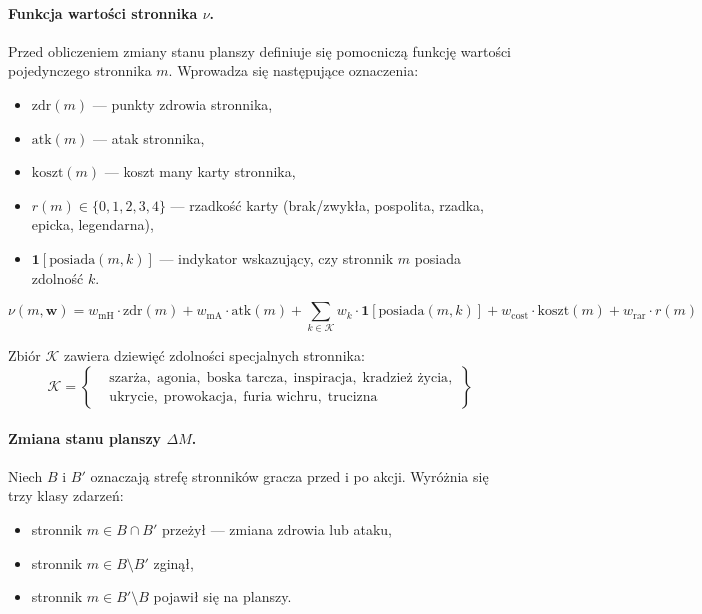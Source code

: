 \paragraph{Funkcja wartości stronnika $\nu$.}

Przed obliczeniem zmiany stanu planszy definiuje się pomocniczą funkcję wartości pojedynczego stronnika $m$. Wprowadza się następujące oznaczenia:
\begin{itemize}
    \item $\text{zdr}(m)$ --- punkty zdrowia stronnika,
    \item $\text{atk}(m)$ --- atak stronnika,
    \item $\text{koszt}(m)$ --- koszt many karty stronnika,
    \item $r(m) \in \{0, 1, 2, 3, 4\}$ --- rzadkość karty (brak/zwykła, pospolita, rzadka, epicka, legendarna),
    \item $\mathbf{1}[\text{posiada}(m, k)]$ --- indykator wskazujący, czy stronnik $m$ posiada zdolność $k$.
\end{itemize}

\begin{equation}
    \nu(m, \mathbf{w}) =
        w_{\text{mH}} \cdot \text{zdr}(m)
        + w_{\text{mA}} \cdot \text{atk}(m)
        + \sum_{k \in \mathcal{K}} w_k \cdot \mathbf{1}[\text{posiada}(m, k)]
        + w_{\text{cost}} \cdot \text{koszt}(m)
        + w_{\text{rar}} \cdot r(m)
    \label{eq:minion_value}
\end{equation}

Zbiór $\mathcal{K}$ zawiera dziewięć zdolności specjalnych stronnika:
\[
\mathcal{K} =
\left\{
\begin{aligned}
&\text{szarża},\; \text{agonia},\; \text{boska tarcza},\; \text{inspiracja},\; \text{kradzież życia},\\
&\text{ukrycie},\; \text{prowokacja},\; \text{furia wichru},\; \text{trucizna}
\end{aligned}
\right\}
\]

\paragraph{Zmiana stanu planszy $\Delta M$.}

Niech $B$ i $B'$ oznaczają strefę stronników gracza przed i po akcji. Wyróżnia się trzy klasy zdarzeń:
\begin{itemize}
    \item stronnik $m \in B \cap B'$ przeżył --- zmiana zdrowia lub ataku,
    \item stronnik $m \in B \setminus B'$ zginął,
    \item stronnik $m \in B' \setminus B$ pojawił się na planszy.
\end{itemize}

